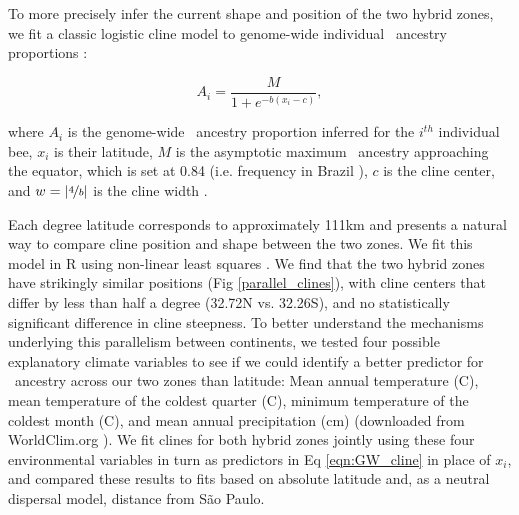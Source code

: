 To more precisely infer the current shape and position of the two hybrid zones, we fit a classic logistic cline model to  genome-wide individual \scutellata\ ancestry proportions \cite{Wang:2019ge,Szymura:1986cm,Szymura:1991ia}:

\begin{equation}
\label{eqn:GW_cline}
A_i = \frac{M}{1 + e^{-b(x_i-c)}},
\end{equation}

where $A_i$ is the genome-wide \scutellata\ ancestry proportion inferred for the $i^{th}$ individual bee, $x_i$ is their latitude, $M$ is the asymptotic maximum \scutellata\ ancestry approaching the equator, which is set at 0.84 (i.e. frequency in Brazil \cite{Nelson:2017cj}), $c$ is the cline center, and $w = |\nicefrac{4}{b}|$ is the cline width .

Each degree latitude corresponds to approximately 111km and presents a natural way to compare cline position and shape between the two zones. We fit this model in R using non-linear least squares . We find that the two hybrid zones have strikingly similar positions (Fig \ref{parallel_clines}), with cline centers that differ by less than half a degree (32.72\degree N vs. 32.26\degree S), and no statistically significant difference in cline steepness. To better understand the mechanisms underlying this parallelism between continents, we tested four possible explanatory climate variables to see if we could identify a better predictor for \scutellata\ ancestry across our two zones than latitude: Mean annual temperature (\degree C), mean temperature of the coldest quarter (\degree C), minimum temperature of the coldest month (\degree C), and mean annual precipitation (cm) (downloaded from WorldClim.org \cite{Hijmans:2005ke}). We fit clines for both hybrid zones jointly using these four environmental variables in turn as predictors in Eq \ref{eqn:GW_cline} in place of $x_i$, and compared these results to fits based on absolute latitude and, as a neutral dispersal model, distance from São Paulo.

